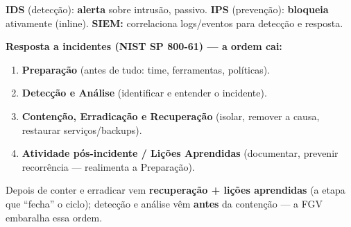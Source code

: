 \textbf{IDS} (detecção): \textbf{alerta} sobre intrusão, passivo. \textbf{IPS}
(prevenção): \textbf{bloqueia} ativamente (inline). \textbf{SIEM:}
correlaciona logs/eventos para detecção e resposta.

\textbf{Resposta a incidentes (NIST SP 800-61) --- a ordem cai:}
\begin{enumerate}
\item \textbf{Preparação} (antes de tudo: time, ferramentas, políticas).
\item \textbf{Detecção e Análise} (identificar e entender o incidente).
\item \textbf{Contenção, Erradicação e Recuperação} (isolar, remover a
causa, restaurar serviços/backups).
\item \textbf{Atividade pós-incidente / Lições Aprendidas} (documentar,
prevenir recorrência --- realimenta a Preparação).
\end{enumerate}

\begin{pegadinha}
Depois de conter e erradicar vem \textbf{recuperação + lições aprendidas} (a
etapa que ``fecha'' o ciclo); detecção e análise vêm \textbf{antes} da
contenção --- a FGV embaralha essa ordem.
\end{pegadinha}

